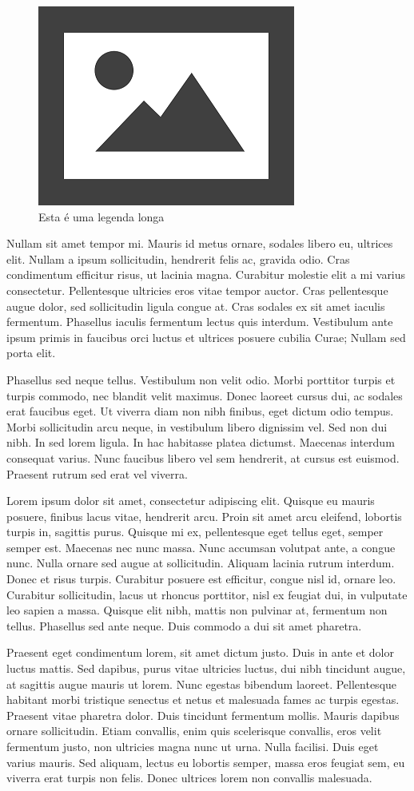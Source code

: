 \documentclass{article}
\begin{document}
	\begin{figure}[H]
		\centering
		\includegraphics[width=0.3\linewidth]{Figuras/fig2}
		\caption[Legenda curta]{Esta é uma legenda longa}
		\label{fig:fig2}
	\end{figure}
	
	Nullam sit amet tempor mi. Mauris id metus ornare, sodales libero eu, ultrices elit. Nullam a ipsum sollicitudin, hendrerit felis ac, gravida odio. Cras condimentum efficitur risus, ut lacinia magna. Curabitur molestie elit a mi varius consectetur. Pellentesque ultricies eros vitae tempor auctor. Cras pellentesque augue dolor, sed sollicitudin ligula congue at. Cras sodales ex sit amet iaculis fermentum. Phasellus iaculis fermentum lectus quis interdum. Vestibulum ante ipsum primis in faucibus orci luctus et ultrices posuere cubilia Curae; Nullam sed porta elit.
	
	Phasellus sed neque tellus. Vestibulum non velit odio. Morbi porttitor turpis et turpis commodo, nec blandit velit maximus. Donec laoreet cursus dui, ac sodales erat faucibus eget. Ut viverra diam non nibh finibus, eget dictum odio tempus. Morbi sollicitudin arcu neque, in vestibulum libero dignissim vel. Sed non dui nibh. In sed lorem ligula. In hac habitasse platea dictumst. Maecenas interdum consequat varius. Nunc faucibus libero vel sem hendrerit, at cursus est euismod. Praesent rutrum sed erat vel viverra. 
	
	Lorem ipsum dolor sit amet, consectetur adipiscing elit. Quisque eu mauris posuere, finibus lacus vitae, hendrerit arcu. Proin sit amet arcu eleifend, lobortis turpis in, sagittis purus. Quisque mi ex, pellentesque eget tellus eget, semper semper est. Maecenas nec nunc massa. Nunc accumsan volutpat ante, a congue nunc. Nulla ornare sed augue at sollicitudin. Aliquam lacinia rutrum interdum. Donec et risus turpis. Curabitur posuere est efficitur, congue nisl id, ornare leo. Curabitur sollicitudin, lacus ut rhoncus porttitor, nisl ex feugiat dui, in vulputate leo sapien a massa. Quisque elit nibh, mattis non pulvinar at, fermentum non tellus. Phasellus sed ante neque. Duis commodo a dui sit amet pharetra.
	
	
	Praesent eget condimentum lorem, sit amet dictum justo. Duis in ante et dolor luctus mattis. Sed dapibus, purus vitae ultricies luctus, dui nibh tincidunt augue, at sagittis augue mauris ut lorem. Nunc egestas bibendum laoreet. Pellentesque habitant morbi tristique senectus et netus et malesuada fames ac turpis egestas. Praesent vitae pharetra dolor. Duis tincidunt fermentum mollis. Mauris dapibus ornare sollicitudin. Etiam convallis, enim quis scelerisque convallis, eros velit fermentum justo, non ultricies magna nunc ut urna. Nulla facilisi. Duis eget varius mauris. Sed aliquam, lectus eu lobortis semper, massa eros feugiat sem, eu viverra erat turpis non felis. Donec ultrices lorem non convallis malesuada.
	
\end{document}
